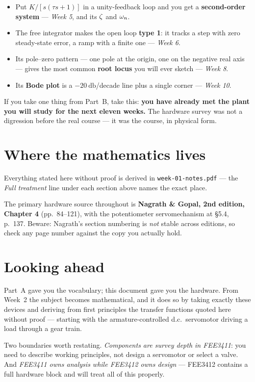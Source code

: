 \documentclass[11pt,a4paper]{article}
\begin{document}
\begin{itemize}[leftmargin=*]
\item Put $K/[s(\tau s+1)]$ in a unity-feedback loop and you get a
      \textbf{second-order system} --- \emph{Week 5}, and its $\zeta$ and $\omega_{n}$.
\item The free integrator makes the open loop \textbf{type 1}: it tracks a step
      with zero steady-state error, a ramp with a finite one --- \emph{Week 6}.
\item Its pole--zero pattern --- one pole at the origin, one on the negative
      real axis --- gives the most common \textbf{root locus} you will ever
      sketch --- \emph{Week 8}.
\item Its \textbf{Bode plot} is a $-\SI{20}{\decibel}$/decade line plus a single
      corner --- \emph{Week 10}.
\end{itemize}

\begin{keyidea}
If you take one thing from Part~B, take this: \textbf{you have already met the
plant you will study for the next eleven weeks.} The hardware survey was not a
digression before the real course --- it was the course, in physical form.
\end{keyidea}

\section*{Where the mathematics lives}

Everything stated here without proof is derived in \texttt{week-01-notes.pdf} ---
the \emph{Full treatment} line under each section above names the exact place.

\smallskip\noindent
The primary hardware source throughout is \textbf{Nagrath \& Gopal, 2nd
edition, Chapter 4} (pp.~84--121), with the potentiometer servomechanism at
\S5.4, p.~137. Beware: Nagrath's section numbering is \emph{not} stable across
editions, so check any page number against the copy you actually hold.

\section*{Looking ahead}

Part~A gave you the vocabulary; this document gave you the hardware. From
Week~2 the subject becomes mathematical, and it does so by taking exactly these
devices and deriving from first principles the transfer functions quoted here
without proof --- starting with the armature-controlled d.c.\ servomotor
driving a load through a gear train.

Two boundaries worth restating. \emph{Components are survey depth in FEE3411}:
you need to describe working principles, not design a servomotor or select a
valve. And \emph{FEE3411 owns analysis while FEE3412 owns design} --- FEE3412
contains a full hardware block and will treat all of this properly.
\end{document}
